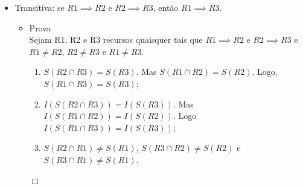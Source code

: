 \begin{itemize}
	\item Transitiva: se $R1 \implies R2$ e $R2 \implies R3$, então $R1 \implies R3$.

	\begin{itemize}
		\item Prova \\

		Sejam R1, R2 e R3 recursos quaisquer tais que $R1 \implies R2$ e $R2 \implies R3$ e $R1 \neq R2$, $R2 \neq R3$ e $R1 \neq R3$. \\

		\begin{enumerate}
			
			\item $S(R2 \cap R3) = S(R3)$. Mas $S(R1 \cap R2) = S(R2)$. Logo, $S(R1 \cap R3) = S(R3)$; \\
			\item $I(S(R2 \cap R3)) = I(S(R3))$. Mas $I(S(R1 \cap R2)) = I(S(R2))$. Logo $I(S(R1 \cap R3)) = I(S(R3))$; \\
			\item $S(R2 \cap R1) \neq S(R1)$, $S(R3 \cap R2) \neq S(R2)$ e $S(R3 \cap R1) \neq S(R1)$.
		\end{enumerate}
		\begin{flushright}$\Box$\end{flushright}
	\end{itemize}	
\end{itemize}

